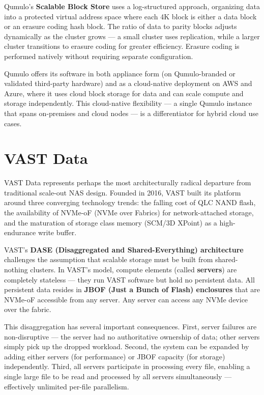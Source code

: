 Qumulo's \textbf{Scalable Block Store} uses a log-structured approach, organizing data into a protected virtual address space where each 4K block is either a data block or an erasure coding hash block. The ratio of data to parity blocks adjusts dynamically as the cluster grows --- a small cluster uses replication, while a larger cluster transitions to erasure coding for greater efficiency. Erasure coding is performed natively without requiring separate configuration.

Qumulo offers its software in both appliance form (on Qumulo-branded or validated third-party hardware) and as a cloud-native deployment on AWS and Azure, where it uses cloud block storage for data and can scale compute and storage independently. This cloud-native flexibility --- a single Qumulo instance that spans on-premises and cloud nodes --- is a differentiator for hybrid cloud use cases.

\section{VAST Data}
VAST Data represents perhaps the most architecturally radical departure from traditional scale-out NAS design. Founded in 2016, VAST built its platform around three converging technology trends: the falling cost of QLC NAND flash, the availability of NVMe-oF (NVMe over Fabrics) for network-attached storage, and the maturation of storage class memory (SCM/3D XPoint) as a high-endurance write buffer.

VAST's \textbf{DASE (Disaggregated and Shared-Everything) architecture} challenges the assumption that scalable storage must be built from shared-nothing clusters. In VAST's model, compute elements (called \textbf{servers}) are completely stateless --- they run VAST software but hold no persistent data. All persistent data resides in \textbf{JBOF (Just a Bunch of Flash) enclosures} that are NVMe-oF accessible from any server. Any server can access any NVMe device over the fabric.

This disaggregation has several important consequences. First, server failures are non-disruptive --- the server had no authoritative ownership of data; other servers simply pick up the dropped workload. Second, the system can be expanded by adding either servers (for performance) or JBOF capacity (for storage) independently. Third, all servers participate in processing every file, enabling a single large file to be read and processed by all servers simultaneously --- effectively unlimited per-file parallelism.

